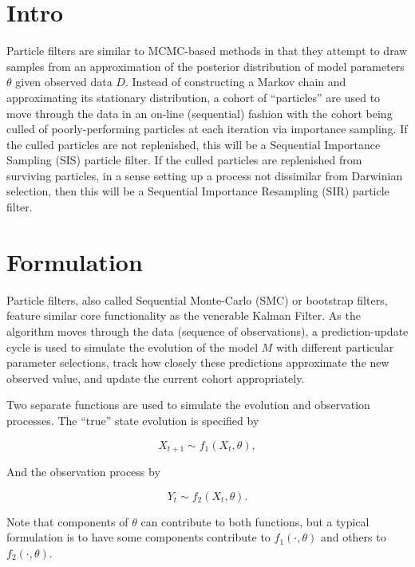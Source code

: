 
\section{Intro}

	Particle filters are similar to MCMC-based methods in that they attempt to draw samples from an approximation of the posterior distribution of model parameters $\theta$ given observed data $D$. Instead of constructing a Markov chain and approximating its stationary distribution, a cohort of ``particles'' are used to move through the data in an on-line (sequential) fashion with the cohort being culled of poorly-performing particles at each iteration via importance sampling. If the culled particles are not replenished, this will be a Sequential Importance Sampling (SIS) particle filter. If the culled particles are replenished from surviving particles, in a sense setting up a process not dissimilar from Darwinian selection, then this will be a Sequential Importance Resampling (SIR) particle filter.


\section{Formulation}

	Particle filters, also called Sequential Monte-Carlo (SMC) or bootstrap filters, feature similar core functionality as the venerable Kalman Filter. As the algorithm moves through the data (sequence of observations), a prediction-update cycle is used to simulate the evolution of the model $M$ with different particular parameter selections, track how closely these predictions approximate the new observed value, and update the current cohort appropriately.

	Two separate functions are used to simulate the evolution and observation processes. The ``true'' state evolution is specified by

	\begin{equation}
		X_{t+1} \sim f_1 (X_t, \theta),
	\end{equation}

	And the observation process by

	\begin{equation}
		Y_t \sim f_2 (X_t, \theta).
	\end{equation}

	Note that components of $\theta$ can contribute to both functions, but a typical formulation is to have some components contribute to $f_1 (\cdot, \theta)$ and others to $f_2 (\cdot,\theta)$.


